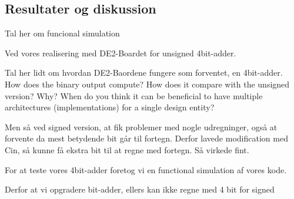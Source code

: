 \documentclass[../journal2.tex]{subfiles}
\begin{document}
\begin{table}[H]
    \centering
      \framebox{
        \rule{8pt}{0pt}
          
}
  \caption{Kode for 4bit-adder med unsigned og signed architecture, c\textunderscore in}	
  \label{src:Tab4}
\end{table}


\subsection{Resultater og diskussion}

Tal her om funcional simulation

Ved vores realisering med DE2-Boardet for unsigned 4bit-adder.



Tal her lidt om hvordan DE2-Baordene fungere som forventet, en 4bit-adder. How does the binary output compute? How does it compare
with the unsigned version? Why? When do you think it can be beneficial to have
multiple architectures (implementations) for a single design entity?

Men så ved signed version, at fik problemer med nogle udregninger, også at forvente da mest betydende bit går til fortegn. Derfor lavede modification med Cin, så kunne få ekstra bit til at regne  med fortegn. Så virkede fint.





For at teste vores 4bit-adder foretog vi en functional simulation af vores kode. 

Derfor at vi opgradere bit-adder, ellers kan ikke regne med 4 bit for signed
\end{document}
